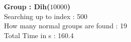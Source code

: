 \textbf{Group : Dih($10000$)}\\
Searching up to index : 500\\
How many normal groups are found : 19\\
Total Time in s : 160.4\\
